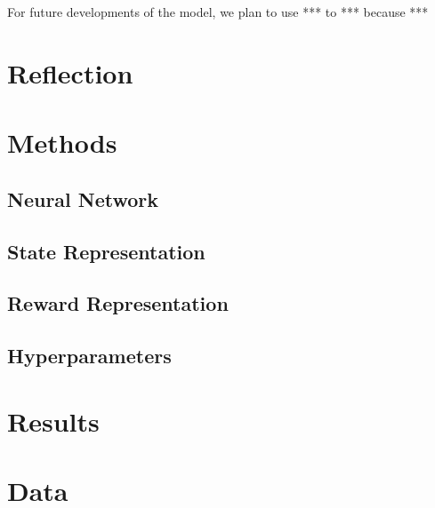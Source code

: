 \documentclass[12pt,a4paper]{article}
\begin{document}
    For future developments of the model, we plan to use *** to *** because ***

    \section{Reflection}\label{sec:reflection}


    \medskip

    
    

    \medskip

    \appendix
    \section{Methods}\label{sec:methods}

    \subsection{Neural Network}\label{subsec:neural-network2}

    \subsection{State Representation}\label{subsec:state-representation}

    \subsection{Reward Representation}\label{subsec:reward-representation}

    \subsection{Hyperparameters}\label{subsec:hyperparameters}


    \section{Results}\label{sec:results}


    \section{Data}\label{sec:data}
\end{document}
